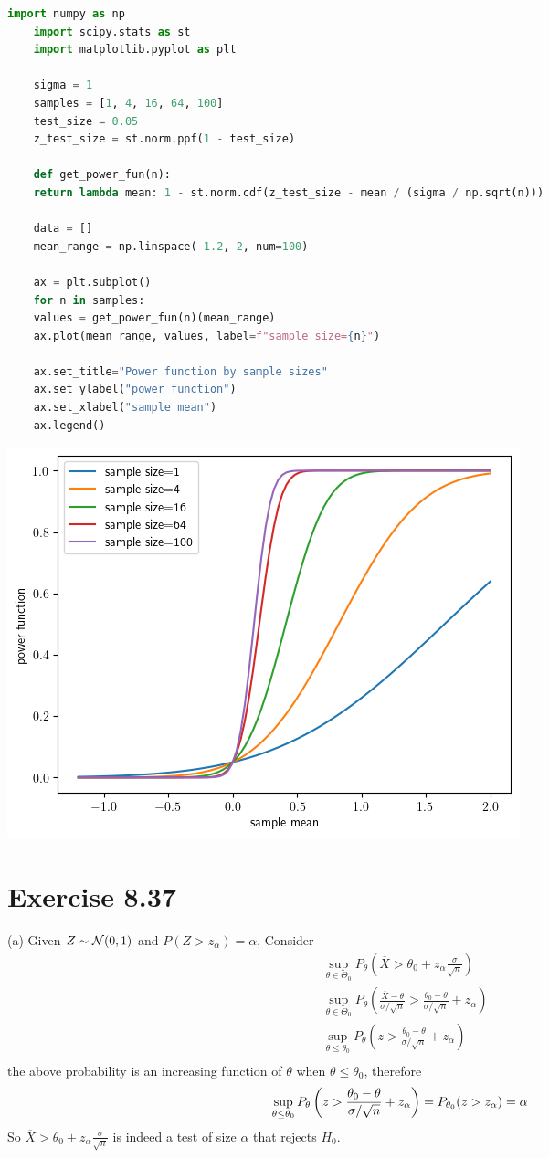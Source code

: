 \documentclass[12pt]{article}
\begin{document}
\begin{lstlisting}[language=Python]
	import numpy as np
	import scipy.stats as st
	import matplotlib.pyplot as plt
	
	sigma = 1
	samples = [1, 4, 16, 64, 100]
	test_size = 0.05
	z_test_size = st.norm.ppf(1 - test_size)
	
	def get_power_fun(n):
	return lambda mean: 1 - st.norm.cdf(z_test_size - mean / (sigma / np.sqrt(n)))
	
	data = []
	mean_range = np.linspace(-1.2, 2, num=100)
	
	ax = plt.subplot()
	for n in samples:
	values = get_power_fun(n)(mean_range)
	ax.plot(mean_range, values, label=f"sample size={n}")
	
	ax.set_title="Power function by sample sizes"
	ax.set_ylabel("power function")
	ax.set_xlabel("sample mean")
	ax.legend()
\end{lstlisting}
\includegraphics{fig_ch_08_12_a}

\section*{Exercise 8.37}
(a) 
Given $Z \sim \mathcal{N}(0, 1)$ and $P(Z > z_\alpha) = \alpha$,  Consider \begin{align*}
	&\sup_{\theta \in \Theta_0} P_{\theta}\left( \overline{X} > \theta_0 + z_{\alpha}\frac{\sigma}{ \sqrt{n}} \right) \\
	&\sup_{\theta \in \Theta_0} P_{\theta}\left( \frac{\overline{X} - \theta}{\sigma / \sqrt{n}} > \frac{\theta_0 - \theta}{\sigma / \sqrt{n}} + z_{\alpha} \right) \\
	&\sup_{\theta \leq \theta_0} P_{\theta}\left( z > \frac{\theta_0 - \theta}{\sigma / \sqrt{n}} + z_{\alpha} \right) \\
\end{align*}
the above probability is an increasing function of $\theta$ when $\theta \leq \theta_0$, therefore
$$
 \sup_{\theta \leq \theta_0} P_{\theta}\left( z > \frac{\theta_0 - \theta}{\sigma / \sqrt{n}} + z_{\alpha} \right) = P_{\theta_0}(z > z_\alpha) = \alpha \\
$$
So $ \overline{X} > \theta_0 + z_{\alpha}\frac{\sigma}{ \sqrt{n}} $ is indeed a test of size $\alpha$ that rejects $H_0$.  \QED
\end{document}
